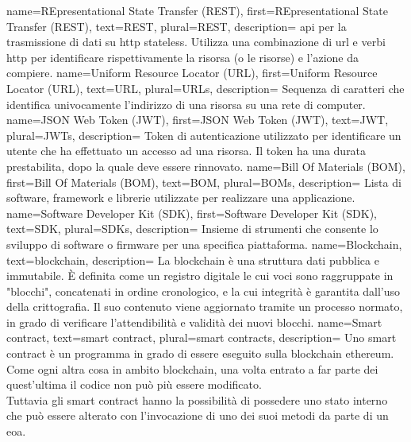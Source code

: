 {
    name={REpresentational State Transfer (REST)},
    first={REpresentational State Transfer (REST)},
    text={REST},
    plural={REST},
    description={
            \gls{api} per la trasmissione di dati su \gls{http} stateless.
            Utilizza una combinazione di \gls{url} e verbi \gls{http} per identificare
            rispettivamente la risorsa (o le risorse) e l'azione da compiere.
        }
}
{
    name={Uniform Resource Locator (URL)},
    first={Uniform Resource Locator (URL)},
    text={URL},
    plural={URLs},
    description={
            Sequenza di caratteri che identifica univocamente l'indirizzo di una risorsa su una rete di computer.
        }
}
{
    name={JSON Web Token (JWT)},
    first={JSON Web Token (JWT)},
    text={JWT},
    plural={JWTs},
    description={
            Token di autenticazione utilizzato per identificare un utente che ha effettuato un accesso ad una risorsa.
            Il token ha una durata prestabilita, dopo la quale deve essere rinnovato.
        }
}
{
    name={Bill Of Materials (BOM)},
    first={Bill Of Materials (BOM)},
    text={BOM},
    plural={BOMs},
    description={
            Lista di software, framework e librerie utilizzate per realizzare una applicazione.
        }
}
{
    name={Software Developer Kit (SDK)},
    first={Software Developer Kit (SDK)},
    text={SDK},
    plural={SDKs},
    description={
            Insieme di strumenti che consente lo sviluppo di software o firmware per una specifica piattaforma.
        }
}
{
    name={Blockchain},
    text={blockchain},
    description={
            La blockchain è una struttura dati pubblica e immutabile.
            È definita come un registro digitale le cui voci sono raggruppate in "blocchi", concatenati in ordine cronologico, e la cui integrità è garantita dall'uso della crittografia.
            Il suo contenuto viene aggiornato tramite un processo normato, in grado di verificare l'attendibilità e validità dei nuovi blocchi.
        }
}
{
    name={Smart contract},
    text={smart contract},
    plural={smart contracts},
    description={
            Uno smart contract è un programma in grado di essere eseguito sulla blockchain \gls{ethereum}.
            Come ogni altra cosa in ambito blockchain, una volta entrato a far parte dei quest'ultima
            il codice non può più essere modificato. \\
            Tuttavia gli smart contract hanno la possibilità di possedere uno stato interno che può essere
            alterato con l'invocazione di uno dei suoi metodi da parte di un \gls{eoa}.
        }
}
